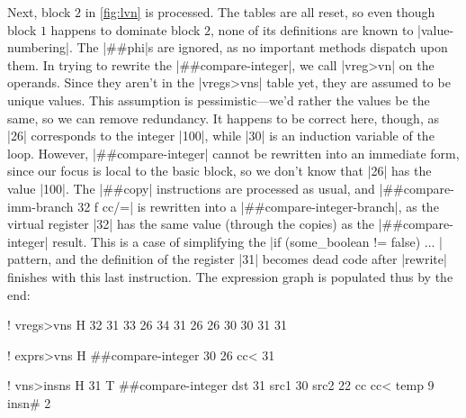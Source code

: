 Next, block $2$ in \vref{fig:lvn} is processed.  The tables are all reset, so
even though block $1$ happens to dominate block $2$,
none of its definitions are known to \factor|value-numbering|.  The
\factor|##phi|s are ignored, as no important methods dispatch upon them.  In
trying to rewrite the \factor|##compare-integer|, we call \factor|vreg>vn| on
the operands.  Since they aren't in the \factor|vregs>vns| table yet, they are
assumed to be unique values.  This assumption is pessimistic---we'd rather the
values be the same, so we can remove redundancy.  It happens to be correct
here, though, as \factor|26| corresponds to the integer \factor|100|, while
\factor|30| is an induction variable of the loop.  However,
\factor|##compare-integer| cannot be rewritten into an immediate form, since
our focus is local to the basic block, so we don't know that \factor|26| has
the value \factor|100|.  The \factor|##copy| instructions are processed as
usual, and
%
\factor|##compare-imm-branch 32 f cc/=|
%
is rewritten into a \factor|##compare-integer-branch|, as the virtual register
\factor|32| has the same value (through the copies) as the
\factor|##compare-integer| result.  This is a case of simplifying the 
%
|if (some_boolean != false) { ... }|
%
pattern, and the definition of the register \factor|31| becomes dead code after
\factor|rewrite| finishes with this last instruction.  The expression graph is
populated thus by the end:
%
  \begin{factorcode}
    ! vregs>vns
    H{
        { 32 31 }
        { 33 26 }
        { 34 31 }
        { 26 26 }
        { 30 30 }
        { 31 31 }
    }

    ! exprs>vns
    H{ { { ##compare-integer 30 26 cc< } 31 } }

    ! vns>insns
    H{
        {
            31
            T{ ##compare-integer
                { dst 31 }
                { src1 30 }
                { src2 22 }
                { cc cc< }
                { temp 9 }
                { insn# 2 }
            }
        }
    }
  \end{factorcode}

